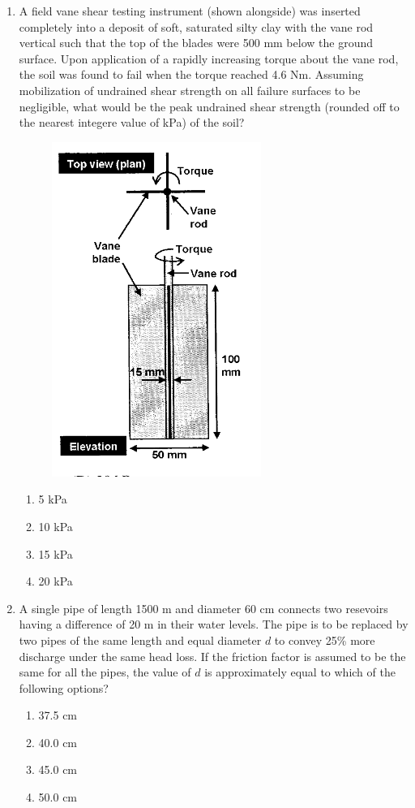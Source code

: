 \documentclass[journal,12pt,onecolumn]{IEEEtran}
\theoremstyle{remark}
\begin{document}
\begin{enumerate}
\item A field vane shear testing instrument (shown alongside) was inserted completely into a deposit of soft, saturated silty clay with the vane rod vertical such that the top of the blades were 500 mm below the ground surface. Upon application of a rapidly increasing torque about the vane rod, the soil was found to fail when the torque reached 4.6 Nm. Assuming mobilization of undrained shear strength on all failure surfaces to be negligible, what would be the peak undrained shear strength (rounded off to the nearest integere value of kPa) of the soil?
\begin{figure}[ht]
\centering
\includegraphics[scale=0.4]{figs/fig7.png}
\end{figure}
	\begin{multicols}{4}
	\begin{enumerate}
		\item 5 kPa
		\item 10 kPa
		\item 15 kPa
		\item 20 kPa
	\end{enumerate}
	\end{multicols}

\item A single pipe of length 1500 m and diameter 60 cm connects two resevoirs having a difference of 20 m in their water levels. The pipe is to be replaced by two pipes of the same length and equal diameter $d$ to convey 25\% more discharge under the same head loss. If the friction factor is assumed to be the same for all the pipes, the value of $d$ is approximately equal to which of the following options?
	\begin{multicols}{4}
	\begin{enumerate}
		\item 37.5 cm
		\item 40.0 cm
		\item 45.0 cm
		\item 50.0 cm
	\end{enumerate}
	\end{multicols}

\end{enumerate}
\end{document}
